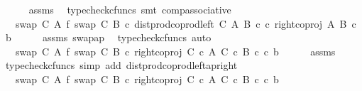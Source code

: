 \begin{isabellebody}
\ \ \ \ \isamarkupfalse%
\ assms\ \isamarkupfalse%
\ {\isacharparenleft}{\kern0pt}typecheck{\isacharunderscore}{\kern0pt}cfuncs{\isacharcomma}{\kern0pt}\ smt\ comp{\isacharunderscore}{\kern0pt}associative{}{\isacharparenright}{\kern0pt}\isanewline
\ \ \isamarkupfalse%
\ \isamarkupfalse%
\ {\isachardoublequoteopen}{\isachardot}{\kern0pt}{\isachardot}{\kern0pt}{\isachardot}{\kern0pt}\ {\isacharequal}{\kern0pt}\ {\isacharparenleft}{\kern0pt}swap\ C\ A\ {\isasymbowtie}\isactrlsub f\ swap\ C\ B{\isacharparenright}{\kern0pt}\ {\isasymcirc}\isactrlsub c\ dist{\isacharunderscore}{\kern0pt}prod{\isacharunderscore}{\kern0pt}coprod{\isacharunderscore}{\kern0pt}left\ C\ A\ B\ {\isasymcirc}\isactrlsub c\ {\isasymlangle}c{\isacharcomma}{\kern0pt}\ right{\isacharunderscore}{\kern0pt}coproj\ A\ B\ {\isasymcirc}\isactrlsub c\ b{\isasymrangle}{\isachardoublequoteclose}\isanewline
\ \ \ \ \isamarkupfalse%
\ assms\ swap{\isacharunderscore}{\kern0pt}ap\ \isamarkupfalse%
\ {\isacharparenleft}{\kern0pt}typecheck{\isacharunderscore}{\kern0pt}cfuncs{\isacharcomma}{\kern0pt}\ auto{\isacharparenright}{\kern0pt}\isanewline
\ \ \isamarkupfalse%
\ \isamarkupfalse%
\ {\isachardoublequoteopen}{\isachardot}{\kern0pt}{\isachardot}{\kern0pt}{\isachardot}{\kern0pt}\ {\isacharequal}{\kern0pt}\ {\isacharparenleft}{\kern0pt}swap\ C\ A\ {\isasymbowtie}\isactrlsub f\ swap\ C\ B{\isacharparenright}{\kern0pt}\ {\isasymcirc}\isactrlsub c\ right{\isacharunderscore}{\kern0pt}coproj\ {\isacharparenleft}{\kern0pt}C\ {\isasymtimes}\isactrlsub c\ A{\isacharparenright}{\kern0pt}\ {\isacharparenleft}{\kern0pt}C\ {\isasymtimes}\isactrlsub c\ B{\isacharparenright}{\kern0pt}\ {\isasymcirc}\isactrlsub c\ {\isasymlangle}c{\isacharcomma}{\kern0pt}\ b{\isasymrangle}{\isachardoublequoteclose}\isanewline
\ \ \ \ \isamarkupfalse%
\ assms\ \isamarkupfalse%
\ {\isacharparenleft}{\kern0pt}typecheck{\isacharunderscore}{\kern0pt}cfuncs{\isacharcomma}{\kern0pt}\ simp\ add{\isacharcolon}{\kern0pt}\ dist{\isacharunderscore}{\kern0pt}prod{\isacharunderscore}{\kern0pt}coprod{\isacharunderscore}{\kern0pt}left{\isacharunderscore}{\kern0pt}ap{\isacharunderscore}{\kern0pt}right{\isacharparenright}{\kern0pt}\isanewline
\ \ \isamarkupfalse%
\ \isamarkupfalse%
\ {\isachardoublequoteopen}{\isachardot}{\kern0pt}{\isachardot}{\kern0pt}{\isachardot}{\kern0pt}\ {\isacharequal}{\kern0pt}\ {\isacharparenleft}{\kern0pt}{\isacharparenleft}{\kern0pt}swap\ C\ A\ {\isasymbowtie}\isactrlsub f\ swap\ C\ B{\isacharparenright}{\kern0pt}\ {\isasymcirc}\isactrlsub c\ right{\isacharunderscore}{\kern0pt}coproj\ {\isacharparenleft}{\kern0pt}C\ {\isasymtimes}\isactrlsub c\ A{\isacharparenright}{\kern0pt}\ {\isacharparenleft}{\kern0pt}C\ {\isasymtimes}\isactrlsub c\ B{\isacharparenright}{\kern0pt}{\isacharparenright}{\kern0pt}\ {\isasymcirc}\isactrlsub c\ {\isasymlangle}c{\isacharcomma}{\kern0pt}\ b{\isasymrangle}{\isachardoublequoteclose}\isanewline

\end{isabellebody}
